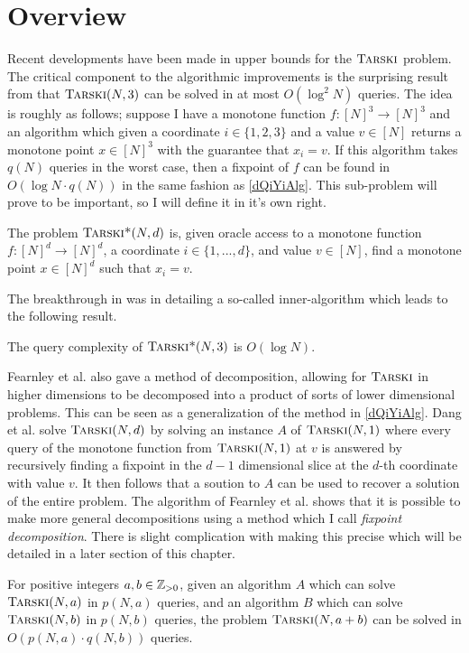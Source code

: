 \section{Overview}
Recent developments have been made in upper bounds for the $\textsc{Tarski}$ problem.
The critical component to the algorithmic improvements is
the surprising result from \citep{fasterTarski} that $\textsc{Tarski}(N, 3)$
can be solved in at most $O(\log^2 N)$ queries.
The idea is roughly as follows; suppose I have
a monotone function $f : [N]^3 \to [N]^3$ and an algorithm which
given a coordinate $i \in \{1, 2, 3\}$ and a value $v \in [N]$
returns a monotone point $x \in [N]^3$ with the guarantee
that $x_i = v$. If this algorithm takes $q(N)$ queries in the worst case,
then a fixpoint of $f$ can be found in $O(\log N \cdot q(N))$ in the
same fashion as \cref{dQiYiAlg}. This sub-problem will prove to be
important, so I will define it in it's own right.
\newcommand{\trsks}{\textsc{Tarski*}}
\begin{definition}[\trsks]
  The problem $\trsks(N, d)$ is, given oracle access to a monotone function $f : [N]^d \to [N]^d$,
  a coordinate $i \in \{1, ..., d\}$, and value $v \in [N]$, find a monotone point $x \in [N]^d$ such that
  $x_i = v$. 
\end{definition}
The breakthrough in \citep{fasterTarski} was in detailing a so-called inner-algorithm which leads to
the following result.
\begin{theorem}
  The query complexity of $\trsks(N, 3)$ is $O(\log N)$.
\end{theorem}
Fearnley et al. also gave a method of decomposition, allowing for $\textsc{Tarski}$ in higher
dimensions to be decomposed into a product of sorts of lower
dimensional problems. This can be seen as a generalization of the method in \cref{dQiYiAlg}.
Dang et al. solve $\textsc{Tarski}(N, d)$ by solving an instance $A$ of $\textsc{Tarski}(N, 1)$ 
where every query of the monotone function from $\textsc{Tarski}(N, 1)$ at $v$ is answered by recursively finding
a fixpoint in the $d-1$ dimensional slice at the $d$-th coordinate with value $v$. It then follows that
a soution to $A$ can be used to recover a solution of the entire problem. The algorithm of
Fearnley et al. shows that it is possible to make more general decompositions using a method
which I call \emph{fixpoint decomposition}. There is slight complication with making this precise
which will be detailed in a later section of this chapter.
\begin{theorem}\label{fixDecomp}
  For positive integers $a, b \in \mathbb{Z}_{> 0}$, given an algorithm $A$
  which can solve $\textsc{Tarski}(N, a)$ in $p(N, a)$ queries, and an algorithm $B$
  which can solve $\textsc{Tarski}(N, b)$ in $p(N, b)$ queries, the problem
  $\textsc{Tarski}(N, a + b)$ can be solved in $O(p(N, a)\cdot q(N, b))$ queries.
\end{theorem}
